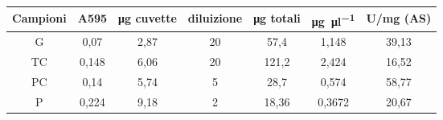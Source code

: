 \begin{tabular}{ccccccc}
\toprule
Campioni & A595 & \si{\ug} cuvette  & diluizione & \si{\ug} totali  & \si{\ug\per\micro\litre} & U/mg (AS)\\
\midrule
G & 0,07 & 2,87 & 20 & 57,4 & 1,148 & 39,13 \\
TC & 0,148 & 6,06 & 20 & 121,2 & 2,424 & 16,52 \\
PC & 0,14 & 5,74 & 5 & 28,7 & 0,574 & 58,77 \\
P & 0,224 & 9,18 & 2 & 18,36 & 0,3672 & 20,67 \\
\bottomrule
\end{tabular}